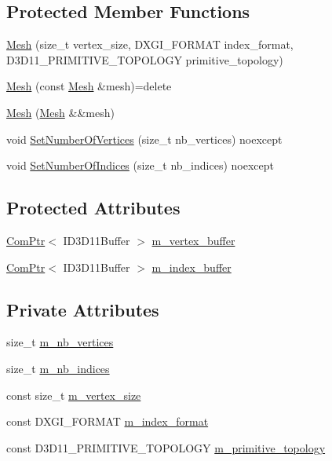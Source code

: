 \subsection*{Protected Member Functions}
\begin{DoxyCompactItemize}
\item 
\hyperlink{classmage_1_1_mesh_a1e61f6254fab6af510d40c437bc2922b}{Mesh} (size\+\_\+t vertex\+\_\+size, D\+X\+G\+I\+\_\+\+F\+O\+R\+M\+AT index\+\_\+format, D3\+D11\+\_\+\+P\+R\+I\+M\+I\+T\+I\+V\+E\+\_\+\+T\+O\+P\+O\+L\+O\+GY primitive\+\_\+topology)
\item 
\hyperlink{classmage_1_1_mesh_a1627e85c72d10bdedbfbf746b108cc73}{Mesh} (const \hyperlink{classmage_1_1_mesh}{Mesh} \&mesh)=delete
\item 
\hyperlink{classmage_1_1_mesh_a2751abe4790ca150f1fcc285504645ae}{Mesh} (\hyperlink{classmage_1_1_mesh}{Mesh} \&\&mesh)
\item 
void \hyperlink{classmage_1_1_mesh_abdb9050ecea85108b1e890a68aa5b656}{Set\+Number\+Of\+Vertices} (size\+\_\+t nb\+\_\+vertices) noexcept
\item 
void \hyperlink{classmage_1_1_mesh_a87ddba20dbdc57b168d38b02e7ccfdd0}{Set\+Number\+Of\+Indices} (size\+\_\+t nb\+\_\+indices) noexcept
\end{DoxyCompactItemize}
\subsection*{Protected Attributes}
\begin{DoxyCompactItemize}
\item 
\hyperlink{namespacemage_ae74f374780900893caa5555d1031fd79}{Com\+Ptr}$<$ I\+D3\+D11\+Buffer $>$ \hyperlink{classmage_1_1_mesh_af5ae74887eb330201829477cf772ba6e}{m\+\_\+vertex\+\_\+buffer}
\item 
\hyperlink{namespacemage_ae74f374780900893caa5555d1031fd79}{Com\+Ptr}$<$ I\+D3\+D11\+Buffer $>$ \hyperlink{classmage_1_1_mesh_abe29363ebac77b284ca69532fd5b3373}{m\+\_\+index\+\_\+buffer}
\end{DoxyCompactItemize}
\subsection*{Private Attributes}
\begin{DoxyCompactItemize}
\item 
size\+\_\+t \hyperlink{classmage_1_1_mesh_a5a04aa73e98c75dd5b8929296c3af9bb}{m\+\_\+nb\+\_\+vertices}
\item 
size\+\_\+t \hyperlink{classmage_1_1_mesh_a5e3baa9e2b2e9b4ce795a456f76d87b2}{m\+\_\+nb\+\_\+indices}
\item 
const size\+\_\+t \hyperlink{classmage_1_1_mesh_ab3ebdfffca054f32ac69e47c486d57b1}{m\+\_\+vertex\+\_\+size}
\item 
const D\+X\+G\+I\+\_\+\+F\+O\+R\+M\+AT \hyperlink{classmage_1_1_mesh_a93dbb92d756948df3b08fc29426c6acf}{m\+\_\+index\+\_\+format}
\item 
const D3\+D11\+\_\+\+P\+R\+I\+M\+I\+T\+I\+V\+E\+\_\+\+T\+O\+P\+O\+L\+O\+GY \hyperlink{classmage_1_1_mesh_a329fab0ad24e11b73a8981c6d09a0c7c}{m\+\_\+primitive\+\_\+topology}
\end{DoxyCompactItemize}


